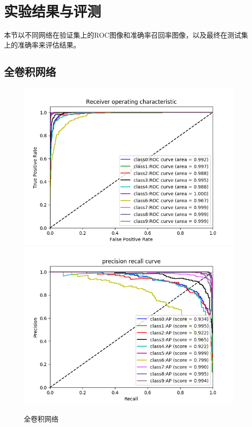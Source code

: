 \documentclass[UTF8]{ctexart}
\begin{document}
\section{实验结果与评测}\label{chapter:4}
本节以不同网络在验证集上的ROC图像和准确率召回率图像，以及最终在测试集上的准确率来评估结果。
\subsection{全卷积网络}
\begin{figure}[H]
    \centering
    \includegraphics[scale=0.35]{../images/cnn4roc.png}  
    \includegraphics[scale=0.35]{../images/cnn4pro.png}
    \caption{全卷积网络}
\end{figure}
\end{document}
